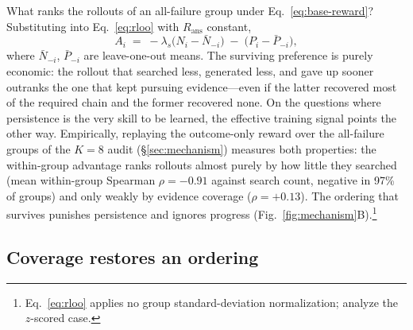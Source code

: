 What ranks the rollouts of an all-failure group under
Eq.~\ref{eq:base-reward}? Substituting into Eq.~\ref{eq:rloo} with
$R_{\mathrm{ans}}$ constant,
\begin{equation}
A_i \;=\; -\lambda_{s}\bigl(N_i - \bar{N}_{-i}\bigr)
\;-\;\bigl(P_i - \bar{P}_{-i}\bigr),
\label{eq:cost-ordering}
\end{equation}
where $\bar{N}_{-i}$, $\bar{P}_{-i}$ are leave-one-out means. The
surviving preference is purely economic: the rollout that searched
less, generated less, and gave up sooner outranks the one that kept
pursuing evidence---even if the latter recovered most of the required
chain and the former recovered none. On the questions where persistence
is the very skill to be learned, the effective training signal points
the other way. Empirically, replaying the outcome-only reward over the
all-failure groups of the $K{=}8$ audit (\S\ref{sec:mechanism})
measures both properties: the within-group advantage ranks rollouts
almost purely by how little they searched (mean within-group Spearman
$\rho = -0.91$ against search count, negative in 97\% of groups) and
only weakly by evidence coverage ($\rho = +0.13$).
The ordering that survives punishes persistence and ignores progress
(Fig.~\ref{fig:mechanism}B).\footnote{Eq.~\ref{eq:rloo} applies no
group standard-deviation normalization; \citet{wang2026darkroom}
analyze the $z$-scored case.}

\subsection{Coverage restores an ordering}
\label{sec:starve-fix}

